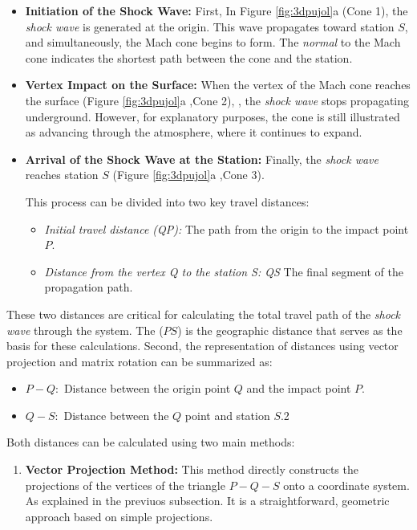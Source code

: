 \documentclass[linenum]{SSA-SRL}
\begin{document}
\begin{flushleft}
\begin{itemize}
    \item \textbf{Initiation of the Shock Wave:} First,  In Figure \ref{fig:3dpujol}a (Cone 1), the \textit{shock wave} is generated at the origin. This wave propagates toward station \( S \), and simultaneously, the Mach cone begins to form. The \textit{normal} to the Mach cone indicates the shortest path between the cone and the station.

    \item \textbf{Vertex Impact on the Surface:} When the vertex of the Mach cone reaches the surface (Figure \ref{fig:3dpujol}a ,Cone 2), , the \textit{shock wave} stops propagating underground. However, for explanatory purposes, the cone is still illustrated as advancing through the atmosphere, where it continues to expand.

    \item \textbf{Arrival of the Shock Wave at the Station:} Finally, the \textit{shock wave} reaches station \( S \) (Figure \ref{fig:3dpujol}a ,Cone 3). 

This process can be divided into two key travel distances:
    \begin{itemize}
        \item \textit{Initial travel distance (QP):} The path from the origin to the impact point \( P\).
        \item \textit{Distance from the vertex Q to the station S: QS} The final segment of the propagation path.
    \end{itemize}
\end{itemize}

These two distances are critical for calculating the total travel path of the \textit{shock wave} through the system. The  (\( PS \)) is the geographic distance that serves as the basis for these calculations. Second, the representation of distances using vector projection and matrix rotation can be summarized as:
\begin{itemize}
    \item \( P-Q: \) Distance between the origin point \( Q \) and the impact point \( P \).
    \item \( Q-S: \) Distance between the \( Q \)  point and station \( S \).2
\end{itemize}

Both distances can be calculated using two main methods:

\begin{enumerate}
    \item \textbf{Vector Projection Method:} This method directly constructs the projections of the vertices of the triangle \( P-Q-S \) onto a coordinate system. As explained in the previuos subsection. It is a straightforward, geometric approach based on simple projections.  


\end{enumerate}
\end{flushleft}
\end{document}
